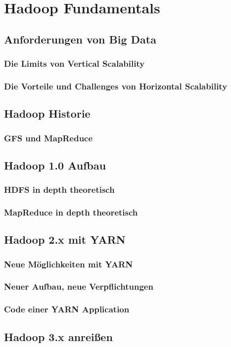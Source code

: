 \chapter{Hadoop Fundamentals}
\section{Anforderungen von Big Data}
\subsection{Die Limits von Vertical Scalability}
\subsection{Die Vorteile und Challenges von Horizontal Scalability}

\section{Hadoop Historie}
\subsection{GFS und MapReduce}

\section{Hadoop 1.0 Aufbau}
\subsection{HDFS in depth theoretisch}
\subsection{MapReduce in depth theoretisch}

\section{Hadoop 2.x mit YARN}
\subsection{Neue Möglichkeiten mit YARN}
\subsection{Neuer Aufbau, neue Verpflichtungen}
\subsection{Code einer YARN Application}

\section{Hadoop 3.x anreißen}